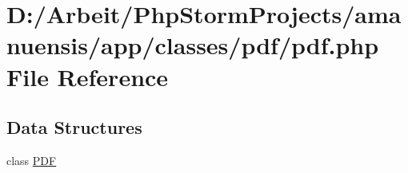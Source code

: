 \hypertarget{pdf_8php}{}\section{D\+:/\+Arbeit/\+Php\+Storm\+Projects/amanuensis/app/classes/pdf/pdf.php File Reference}
\label{pdf_8php}
\subsection*{Data Structures}
\begin{DoxyCompactItemize}
\item 
class \hyperlink{class_p_d_f}{P\+D\+F}
\end{DoxyCompactItemize}
